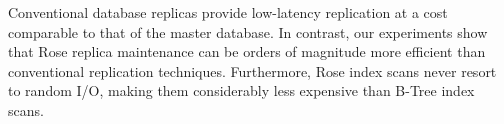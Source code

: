 \documentclass{vldb}
\newcommand{\rows}{Rose\xspace}
\begin{document}





Conventional database replicas provide low-latency replication at a
cost comparable to that of the master database.  In contrast, our
experiments show that \rows replica maintenance can be orders of
magnitude more efficient than conventional replication techniques.
Furthermore, \rows index scans never resort to random I/O, making them
considerably less expensive than B-Tree index scans.
\end{document}
